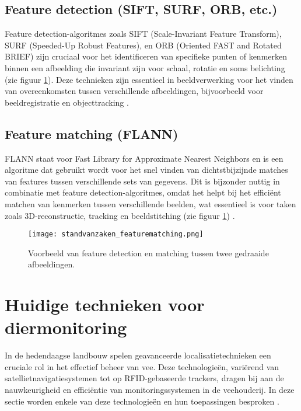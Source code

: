 \subsection{Feature detection (SIFT, SURF, ORB, etc.)}
Feature detection-algoritmes zoals SIFT (Scale-Invariant Feature Transform), SURF (Speeded-Up Robust Features), en ORB (Oriented FAST and Rotated BRIEF) zijn cruciaal voor het identificeren van specifieke punten of kenmerken binnen een afbeelding die invariant zijn voor schaal, rotatie en soms belichting (zie figuur \ref{fig:standvanzaken_featurematching}). Deze technieken zijn essentieel in beeldverwerking voor het vinden van overeenkomsten tussen verschillende afbeeldingen, bijvoorbeeld voor beeldregistratie en objecttracking \autocite{tareen2018comparative}.

\subsection{Feature matching (FLANN)}
FLANN staat voor Fast Library for Approximate Nearest Neighbors en is een algoritme dat gebruikt wordt voor het snel vinden van dichtstbijzijnde matches van features tussen verschillende sets van gegevens. Dit is bijzonder nuttig in combinatie met feature detection-algoritmes, omdat het helpt bij het efficiënt matchen van kenmerken tussen verschillende beelden, wat essentieel is voor taken zoals 3D-reconstructie, tracking en beeldstitching (zie figuur \ref{fig:standvanzaken_featurematching}) \autocite{Cong2016fast}.
\newline
\begin{figure}[H]
  \centering
  \texttt{[image: standvanzaken\_featurematching.png]}
  \caption{Voorbeeld van feature detection en matching tussen twee gedraaide afbeeldingen. \cite{haskell_opencv}}
  \label{fig:standvanzaken_featurematching}  
\end{figure}
\newline

\section{Huidige technieken voor diermonitoring}
In de hedendaagse landbouw spelen geavanceerde localisatietechnieken een cruciale rol in het effectief beheer van vee. Deze technologieën, variërend van satellietnavigatiesystemen tot op RFID-gebaseerde trackers, dragen bij aan de nauwkeurigheid en efficiëntie van monitoringssystemen in de veehouderij. In deze sectie worden enkele van deze technologieën en hun toepassingen besproken \autocite{halachmi2019smart}.


